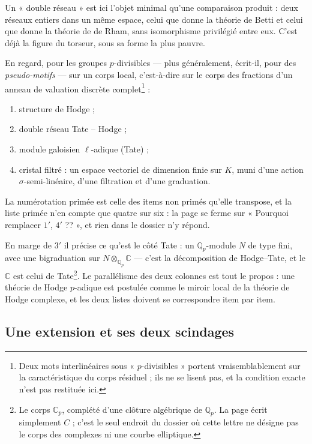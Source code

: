 \documentclass[11pt,a4paper]{article}
\begin{document}
Un « double réseau » est ici l'objet minimal qu'une comparaison produit : deux
réseaux entiers dans un même espace, celui que donne la théorie de Betti et
celui que donne la théorie de de Rham, sans isomorphisme privilégié entre eux.
C'est déjà la figure du torseur, sous sa forme la plus pauvre.

En regard, pour les groupes $p$-divisibles — plus généralement, écrit-il, pour
des \emph{pseudo-motifs} — sur un corps local, c'est-à-dire sur le corps des
fractions d'un anneau de valuation discrète complet\footnote{Deux mots
interlinéaires sous « $p$-divisibles » portent vraisemblablement sur la
caractéristique du corps résiduel ; ils ne se lisent pas, et la condition
exacte n'est pas restituée ici.} :

\begin{enumerate}
  \item[$3'$)] structure de Hodge ;
  \item[$2'$)] double réseau Tate -- Hodge ;
  \item[$5'$)] module galoisien $\ell$-adique (Tate) ;
  \item[$6'$)] cristal filtré : un espace vectoriel de dimension finie sur $K$,
        muni d'une action $\sigma$-semi-linéaire, d'une filtration et d'une
        graduation.
\end{enumerate}

La numérotation primée est celle des items non primés qu'elle transpose, et la
liste primée n'en compte que quatre sur six : la page se ferme sur « Pourquoi
remplacer $1'$, $4'$ ?? », et rien dans le dossier n'y répond.

En marge de $3'$ il précise ce qu'est le côté Tate : un
$\mathbb{Q}_{p}$-module $N$ de type fini, avec une bigraduation sur
$N \otimes_{\mathbb{Q}_{p}} \mathbb{C}$ — c'est la décomposition de Hodge--Tate,
et le $\mathbb{C}$ est celui de Tate\footnote{Le corps $\mathbb{C}_{p}$,
complété d'une clôture algébrique de $\mathbb{Q}_{p}$. La page écrit simplement
$C$ ; c'est le seul endroit du dossier où cette lettre ne désigne pas le corps
des complexes ni une courbe elliptique.}. Le parallélisme des deux colonnes est
tout le propos : une théorie de Hodge $p$-adique est postulée comme le miroir
local de la théorie de Hodge complexe, et les deux listes doivent se
correspondre item par item.

\subsection*{Une extension et ses deux scindages}
\end{document}
